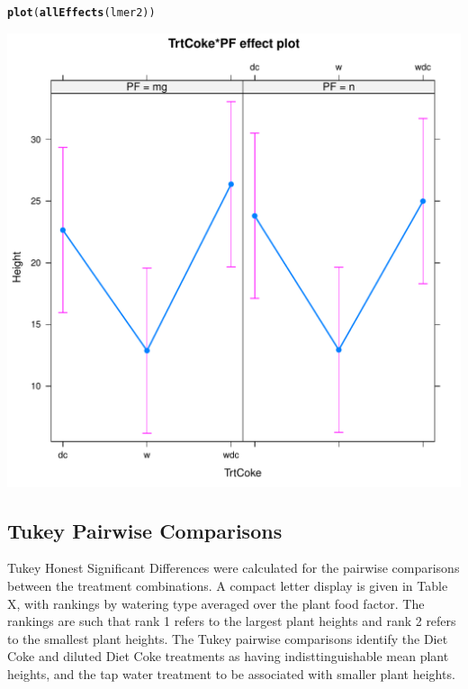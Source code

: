 \documentclass[preprint,12pt]{elsarticle}\usepackage[]{graphicx}\usepackage[]{color}
\makeatletter
\def\maxwidth{ %
  \ifdim\Gin@nat@width>\linewidth
    \linewidth
  \else
    \Gin@nat@width
  \fi
}
\newcommand{\hlstd}[1]{\textcolor[rgb]{0.345,0.345,0.345}{#1}}%
\newcommand{\hlkwd}[1]{\textcolor[rgb]{0.737,0.353,0.396}{\textbf{#1}}}%
\newenvironment{kframe}{%
 \def\at@end@of@kframe{}%
 \ifinner\ifhmode%
  \def\at@end@of@kframe{\end{minipage}}%
  \begin{minipage}{\columnwidth}%
 \fi\fi%
 \def\FrameCommand##1{\hskip\@totalleftmargin \hskip-\fboxsep
 \colorbox{shadecolor}{##1}\hskip-\fboxsep
     \hskip-\linewidth \hskip-\@totalleftmargin \hskip\columnwidth}%
 \MakeFramed {\advance\hsize-\width
   \@totalleftmargin\z@ \linewidth\hsize
   \@setminipage}}%
 {\par\unskip\endMakeFramed%
 \at@end@of@kframe}
\newenvironment{knitrout}{}{} %
\makeatother
\begin{document}
\begin{knitrout}
\begin{kframe}
{\ttfamily\noindent\bfseries{}}\begin{alltt}
\hlkwd{plot}\hlstd{(}\hlkwd{allEffects}\hlstd{(lmer2))}
\end{alltt}
\end{kframe}
\includegraphics[width=\maxwidth]{figure/unnamed-chunk-1-1} 

\end{knitrout}


\subsection{Tukey Pairwise Comparisons}

Tukey Honest Significant Differences were calculated for the pairwise comparisons between the treatment combinations. A compact letter display is given in Table X, with rankings by watering type averaged over the plant food factor. The rankings are such that rank 1 refers to the largest plant heights and rank 2 refers to the smallest plant heights.  The Tukey pairwise comparisons identify the Diet Coke and diluted Diet Coke treatments as having indisttinguishable mean plant heights, and the tap water treatment to be associated with smaller plant heights. 
\end{document}
